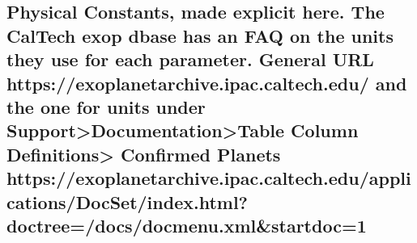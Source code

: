 \documentclass[11pt]{article}
\begin{document}
    \subsection{Physical Constants, made explicit here. The CalTech exop
dbase has an FAQ on the units they use for each parameter. General URL
https://exoplanetarchive.ipac.caltech.edu/ and the one for units under
Support\textgreater{}Documentation\textgreater{}Table Column
Definitions\textgreater{} Confirmed Planets
https://exoplanetarchive.ipac.caltech.edu/applications/DocSet/index.html?doctree=/docs/docmenu.xml\&startdoc=1}\label{physical-constants-made-explicit-here.-the-caltech-exop-dbase-has-an-faq-on-the-units-they-use-for-each-parameter.-general-url-httpsexoplanetarchive.ipac.caltech.edu-and-the-one-for-units-under-supportdocumentationtable-column-definitions-confirmed-planets-httpsexoplanetarchive.ipac.caltech.eduapplicationsdocsetindex.htmldoctreedocsdocmenu.xmlstartdoc1}
\end{document}

